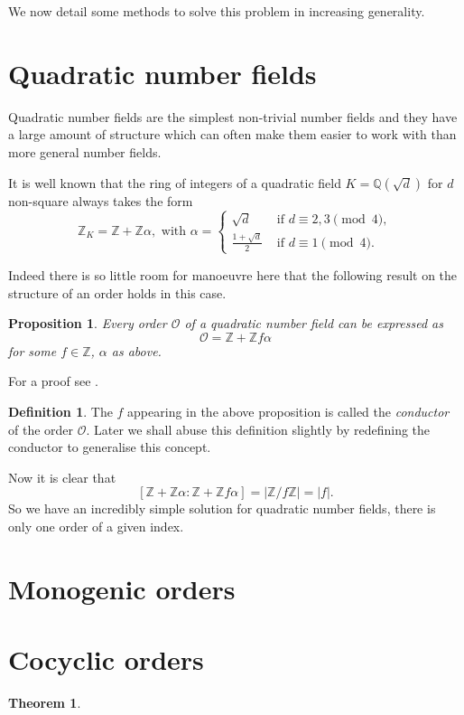 \documentclass[a4paper,abstracton]{scrreprt}
\newtheorem{thm}{Theorem}
\newtheorem{prop}{Proposition}
\theoremstyle{definition}
\newtheorem{defn}{Definition}
\newcommand{\QQ}{\mathbb{Q}}
\newcommand{\ZZ}{\mathbb{Z}}
\renewcommand{\O}{\mathcal{O}}
\begin{document}
We now detail some methods to solve this problem in increasing generality.

\section{Quadratic number fields}

Quadratic number fields are the simplest non-trivial number fields and they have a large amount of structure which can often make them easier to work with than more general number fields.

It is well known \cite{lang} that the ring of integers of a quadratic field $K = \QQ(\sqrt{d})$ for $d$ non-square always takes the form
\[\ZZ_K = \ZZ + \ZZ\alpha,\text{ with } \alpha =\begin{cases}
\sqrt{d}&\text{ if $d\equiv 2,3\pmod{4}$},\\
\frac{1+\sqrt{d}}{2}&\text{ if $d\equiv 1\pmod{4}$}.
\end{cases}\]

Indeed there is so little room for manoeuvre here that the following result on the structure of an order holds in this case.

\begin{prop}
Every order $\O$ of a quadratic number field can be expressed as
\[\O = \ZZ + \ZZ f\alpha\]
for some $f\in \ZZ$, $\alpha$ as above.
\end{prop}

For a proof see \cite[pp. 133--134]{cox}.

\begin{defn}
The $f$ appearing in the above proposition is called the \emph{conductor} of the order $\O$.
Later we shall abuse this definition slightly by redefining the conductor to generalise this concept.
\end{defn}

Now it is clear that
\[
[\ZZ + \ZZ\alpha \colon \ZZ + \ZZ f \alpha] = |\ZZ/f\ZZ| = |f|.
\]
So we have an incredibly simple solution for quadratic number fields, there is only one order of a given index.%

\section{Monogenic orders}


\section{Cocyclic orders}
\begin{thm}
\label{thm:coresp}
\end{thm}
\end{document}
